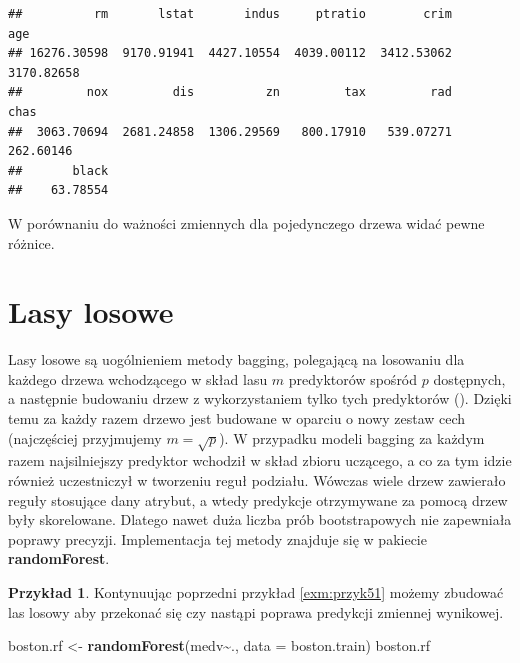 \documentclass[
]{book}
\newenvironment{Shaded}{\begin{snugshade}}{\end{snugshade}}
\newcommand{\AttributeTok}[1]{\textcolor[rgb]{0.13,0.29,0.53}{#1}}
\newcommand{\FunctionTok}[1]{\textcolor[rgb]{0.13,0.29,0.53}{\textbf{#1}}}
\newcommand{\NormalTok}[1]{#1}
\newcommand{\OtherTok}[1]{\textcolor[rgb]{0.56,0.35,0.01}{#1}}
\newcommand{\SpecialCharTok}[1]{\textcolor[rgb]{0.81,0.36,0.00}{\textbf{#1}}}
\theoremstyle{plain}
\theoremstyle{definition}
\theoremstyle{definition}
\theoremstyle{definition}
\newtheorem{example}{Przykład}[chapter]
\theoremstyle{definition}
\theoremstyle{definition}
\theoremstyle{remark}
\begin{document}
\begin{Shaded}
\end{Shaded}

\begin{verbatim}
##          rm       lstat       indus     ptratio        crim         age 
## 16276.30598  9170.91941  4427.10554  4039.00112  3412.53062  3170.82658 
##         nox         dis          zn         tax         rad        chas 
##  3063.70694  2681.24858  1306.29569   800.17910   539.07271   262.60146 
##       black 
##    63.78554
\end{verbatim}

W porównaniu do ważności zmiennych dla pojedynczego drzewa widać pewne różnice.

\section{Lasy losowe}\label{lasy-losowe}

Lasy losowe są uogólnieniem metody bagging, polegającą na losowaniu dla każdego drzewa wchodzącego w skład lasu \(m\) predyktorów spośród \(p\) dostępnych, a następnie budowaniu drzew z wykorzystaniem tylko tych predyktorów (). Dzięki temu za każdy razem drzewo jest budowane w oparciu o nowy zestaw cech (najczęściej przyjmujemy \(m=\sqrt{p}\)). W przypadku modeli bagging za każdym razem najsilniejszy predyktor wchodził w skład zbioru uczącego, a co za tym idzie również uczestniczył w tworzeniu reguł podziału. Wówczas wiele drzew zawierało reguły stosujące dany atrybut, a wtedy predykcje otrzymywane za pomocą drzew były skorelowane. Dlatego nawet duża liczba prób bootstrapowych nie zapewniała poprawy precyzji. Implementacja tej metody znajduje się w pakiecie \textbf{randomForest}.

\begin{example}
\protect\hypertarget{exm:przyk52}{}\label{exm:przyk52}Kontynuując poprzedni przykład \ref{exm:przyk51} możemy zbudować las losowy aby przekonać się czy nastąpi poprawa predykcji zmiennej wynikowej.
\end{example}

\begin{Shaded}
\begin{Highlighting}[]
\NormalTok{boston.rf }\OtherTok{\textless{}{-}} \FunctionTok{randomForest}\NormalTok{(medv}\SpecialCharTok{\textasciitilde{}}\NormalTok{., }\AttributeTok{data =}\NormalTok{ boston.train)}
\NormalTok{boston.rf}
\end{Highlighting}
\end{Shaded}
\end{document}
